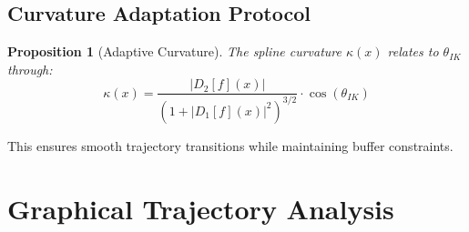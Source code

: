 \documentclass[11pt,a4paper]{article}
\theoremstyle{definition}
\theoremstyle{plain}
\newtheorem{proposition}[theorem]{Proposition}
\begin{document}
\subsection{Curvature Adaptation Protocol}

\begin{proposition}[Adaptive Curvature]
The spline curvature $\kappa(x)$ relates to $\theta_{IK}$ through:
\begin{equation}
\kappa(x) = \frac{|D_2[f](x)|}{(1 + |D_1[f](x)|^2)^{3/2}} \cdot \cos(\theta_{IK})
\end{equation}
\end{proposition}

This ensures smooth trajectory transitions while maintaining buffer constraints.

\section{Graphical Trajectory Analysis}
\end{document}
